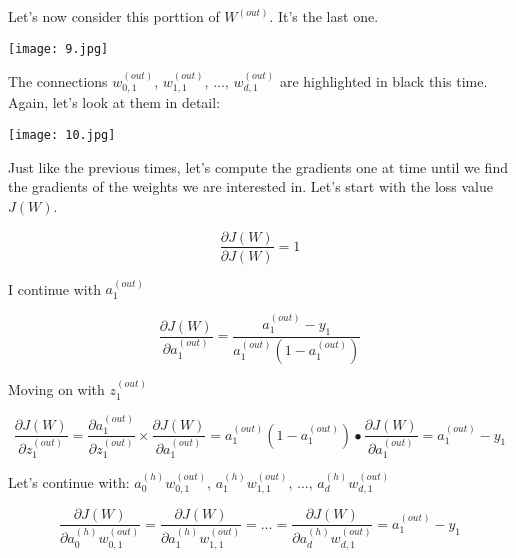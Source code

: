 \documentclass[../main.tex]{subfiles}
\begin{document}
Let's now consider this porttion of $W^{(out)}$. It's the last one.
\begin{center}
    \texttt{[image: 9.jpg]}
\end{center}

\vspace{5mm} %

The connections $w_{0,1}^{(out)}$, $w_{1,1}^{(out)}$, ..., $w_{d,1}^{(out)}$ are
highlighted in black this time. Again, let's look at them in detail:

\vspace{5mm} %

\begin{center}
    \texttt{[image: 10.jpg]}
\end{center}

\vspace{5mm} %

Just like the previous times, let's compute the gradients one at time until
we find the gradients of the weights we are interested in. Let's start
with the loss value $J(W)$.

\vspace{5mm} %

\[\frac{\partial J(W)}{\partial J(W)} = 1 \]

I continue with $a_{1}^{(out)}$

\[
    \frac{\partial J(W)}{\partial a_{1}^{(out)}} =
    \frac{a_{1}^{(out)} - y_{1}}{a_{{1}}^{(out)}(1 - a_{1}^{(out)})}
\]

\vspace{5mm} %

Moving on with $z_{1}^{(out)}$

\[
    \frac{\partial J(W)}{\partial z_{1}^{(out)}} =
    \frac{\partial a_{1}^{(out)}}{\partial z_{1}^{(out)}} \times
    \frac{\partial J(W)}{\partial a_{1}^{(out)}} =
    a_{1}^{(out)}(1 - a_{1}^{(out)}) \bullet \frac{\partial J(W)}{\partial a_{1}^{(out)}} =
    a_{1}^{(out)} - y_1
\]

\vspace{5mm} %

Let's continue with: $a_0^{(h)}w_{0,1}^{(out)}$, $a_1^{(h)}w_{1,1}^{(out)}$, ..., $a_d^{(h)}w_{d,1}^{(out)}$

\[
    \frac{\partial J(W)}{\partial a_0^{(h)}w_{0,1}^{(out)}} =
    \frac{\partial J(W)}{\partial a_1^{(h)}w_{1,1}^{(out)}} =
    \dots =
    \frac{\partial J(W)}{\partial a_d^{(h)}w_{d,1}^{(out)}} = 
    a_{1}^{(out)} - y_1
\]
\end{document}
